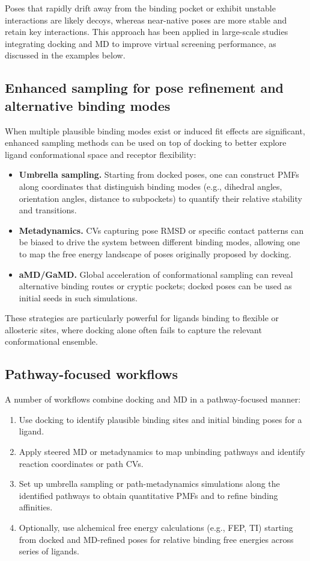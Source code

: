 \documentclass[12pt,a4paper]{article}
\begin{document}
Poses that rapidly drift away from the binding pocket or exhibit unstable interactions are likely decoys, whereas near-native poses are more stable and retain key interactions. This approach has been applied in large-scale studies integrating docking and MD to improve virtual screening performance, as discussed in the examples below.

\subsection{Enhanced sampling for pose refinement and alternative binding modes}

When multiple plausible binding modes exist or induced fit effects are significant, enhanced sampling methods can be used on top of docking to better explore ligand conformational space and receptor flexibility:

\begin{itemize}
\item \textbf{Umbrella sampling.} Starting from docked poses, one can construct PMFs along coordinates that distinguish binding modes (e.g., dihedral angles, orientation angles, distance to subpockets) to quantify their relative stability and transitions.
\item \textbf{Metadynamics.} CVs capturing pose RMSD or specific contact patterns can be biased to drive the system between different binding modes, allowing one to map the free energy landscape of poses originally proposed by docking.
\item \textbf{aMD/GaMD.} Global acceleration of conformational sampling can reveal alternative binding routes or cryptic pockets; docked poses can be used as initial seeds in such simulations.
\end{itemize}

These strategies are particularly powerful for ligands binding to flexible or allosteric sites, where docking alone often fails to capture the relevant conformational ensemble.

\subsection{Pathway-focused workflows}

A number of workflows combine docking and MD in a pathway-focused manner:

\begin{enumerate}
\item Use docking to identify plausible binding sites and initial binding poses for a ligand.
\item Apply steered MD or metadynamics to map unbinding pathways and identify reaction coordinates or path CVs.
\item Set up umbrella sampling or path-metadynamics simulations along the identified pathways to obtain quantitative PMFs and to refine binding affinities.
\item Optionally, use alchemical free energy calculations (e.g., FEP, TI) starting from docked and MD-refined poses for relative binding free energies across series of ligands.
\end{enumerate}
\end{document}
